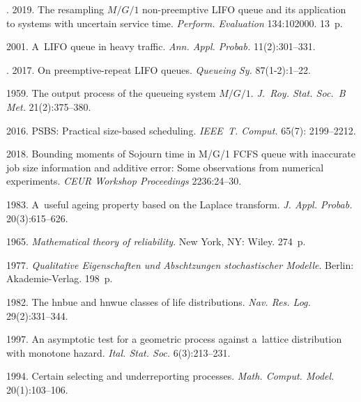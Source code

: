 \begin{multicols}{2}
{{\begin{thebibliography}{99}
. 2019.
The resampling $M/G/1$ non-preemptive LIFO queue and its application 
to systems with uncertain service time. \textit{Perform. Evaluation} 134:102000. 13~p.



 2001. A~LIFO queue in heavy traffic. 
\textit{Ann. Appl. Probab.} 11(2):301--331.

. 2017. On preemptive-repeat LIFO queues. 
\textit{Queueing Sy.} 87(1-2):1--22.



 1959. 
The output process of the queueing system $M/G/1$. 
\textit{J.~Roy. Stat. Soc.~B Met.} 21(2):375--380.

 2016. 
\mbox{PSBS}: Practical size-based scheduling. 
\textit{IEEE~T. Comput.} 65(7): 2199--2212.


 2018.
Bounding moments of Sojourn time in M/G/1 
FCFS queue with inaccurate job size information and additive error: Some 
observations from numerical experiments. \textit{CEUR Workshop Proceedings} 
2236:24--30.


 1983.
A~useful ageing property based on the Laplace transform. 
\textit{J. Appl. Probab.} 20(3):615--626.

 1965. \textit{Mathematical theory of reliability}.
New York, NY: Wiley. 274~p.

 1977. \textit{Qualitative Eigenschaften und Abschtzungen 
stochastischer Modelle}. Berlin: Akademie-Verlag. 198~p.




 1982. The hnbue and hnwue 
classes of life distributions. \textit{Nav. Res. Log.} 29(2):331--344. 

 1997. An asymptotic test for a geometric process against 
a~lattice distribution with monotone hazard.  \textit{Ital. Stat. Soc.} 6(3):213--231. 


 1994.
Certain selecting and underreporting processes. \textit{Math. Comput. Model.} 
20(1):103--106.


\end{thebibliography}}}
\end{multicols}
